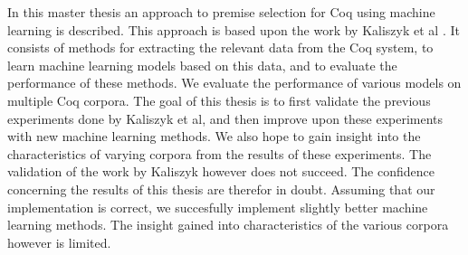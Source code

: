 \thispagestyle{empty}

In this master thesis an approach to premise selection for Coq using machine learning is described.
This approach is based upon the work by Kaliszyk et al \cite{kaliszyk2014machine}.
It consists of methods for extracting the relevant data from the Coq system, to learn
machine learning models based on this data, and to evaluate the performance of these methods.
We evaluate the performance of various models on multiple Coq corpora.
The goal of this thesis is to first validate the previous experiments done by Kaliszyk et al,
and then improve upon these experiments with new machine learning methods.
We also hope to gain insight into the characteristics of varying corpora from the results of these experiments.
The validation of the work by Kaliszyk however does not succeed.
The confidence concerning the results of this thesis are therefor in doubt.
Assuming that our implementation is correct, we succesfully implement slightly better machine learning methods.
The insight gained into characteristics of the various corpora however is limited.
